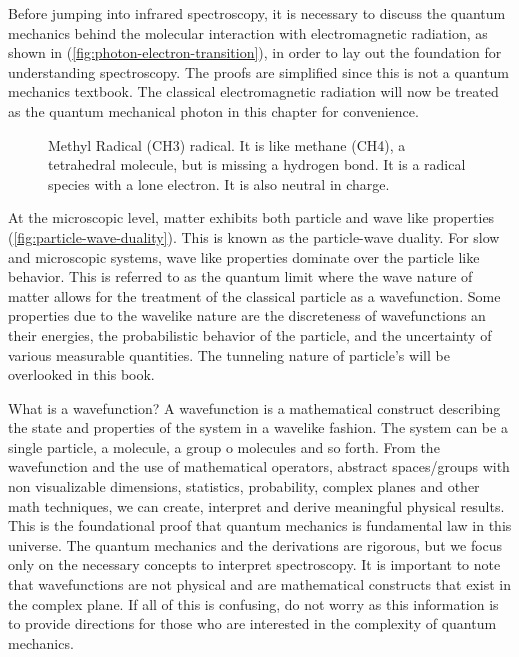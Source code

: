 \documentclass[11pt,a4paper]{book}
\newcommand{\imginput}[1]{} %
\begin{document}
	Before jumping into infrared spectroscopy, it is necessary to discuss the quantum mechanics behind the molecular interaction with electromagnetic radiation, as shown in (\autoref{fig:photon-electron-transition}), in order to lay out the foundation for understanding spectroscopy. The proofs are simplified since this is not a quantum mechanics textbook. The classical electromagnetic radiation will now be treated as the quantum mechanical photon in this chapter for convenience. 
	
	\begin{figure} [!ht]
		\centering
		\Large
		\def\svgwidth{\columnwidth}
		\resizebox{12cm}{!}{\imginput{images/methyl-radical.pdf_tex}}
		\caption{{Methyl Radical (CH3) radical. It is like methane (CH4), a tetrahedral molecule, but is missing a hydrogen bond. It is a radical species with a lone electron. It is also neutral in charge.}}
		\label{fig:methyl-radical}
	\end{figure}
	
	At the microscopic level, matter exhibits both particle and wave like properties (\autoref{fig:particle-wave-duality}). This is known as the particle-wave duality. For slow and microscopic systems, wave like properties dominate over the particle like behavior. This is referred to as the quantum limit where the wave nature of matter allows for the treatment of the classical particle as a wavefunction. Some properties due to the wavelike nature are the discreteness of wavefunctions an their energies, the probabilistic behavior of the particle, and the uncertainty of various measurable quantities. The tunneling nature of particle's will be overlooked in this book. 
	
	What is a wavefunction? A wavefunction is a mathematical construct describing the state and properties of the system in a wavelike fashion. The system can be a single particle, a molecule, a group o molecules and so forth. From the wavefunction and the use of mathematical operators, abstract spaces/groups with non visualizable dimensions, statistics, probability, complex planes and other math techniques, we can create, interpret and derive meaningful physical results. This is the foundational proof that quantum mechanics is fundamental law in this universe. The quantum mechanics and the derivations are rigorous, but we focus only on the necessary concepts to interpret spectroscopy. It is important to note that wavefunctions are not physical and are mathematical constructs that exist in the complex plane. If all of this is confusing, do not worry as this information is to provide directions for those who are interested in the complexity of quantum mechanics.
	
\end{document}
